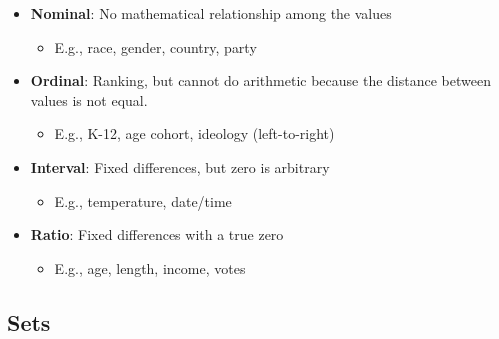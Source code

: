 \begin{itemize}
    \itemsep-0.5em 
    \item \textbf{Nominal}: No mathematical relationship among the values
    \vspace{-0.75em}
    \begin{itemize}
        \item E.g., race, gender, country, party
    \end{itemize}
    \item \textbf{Ordinal}: Ranking, but cannot do arithmetic because the distance between values is not equal.
    \vspace{-0.75em}
    \begin{itemize}
        \item E.g., K-12, age cohort, ideology (left-to-right)
    \end{itemize}
    \item \textbf{Interval}: Fixed differences, but zero is arbitrary
    \vspace{-0.75em}
    \begin{itemize}
        \item E.g., temperature, date/time
    \end{itemize}
    \item \textbf{Ratio}: Fixed differences with a true zero
    \vspace{-0.75em}
    \begin{itemize}
        \item E.g., age, length, income, votes
    \end{itemize}
\end{itemize}

\subsection{Sets}

